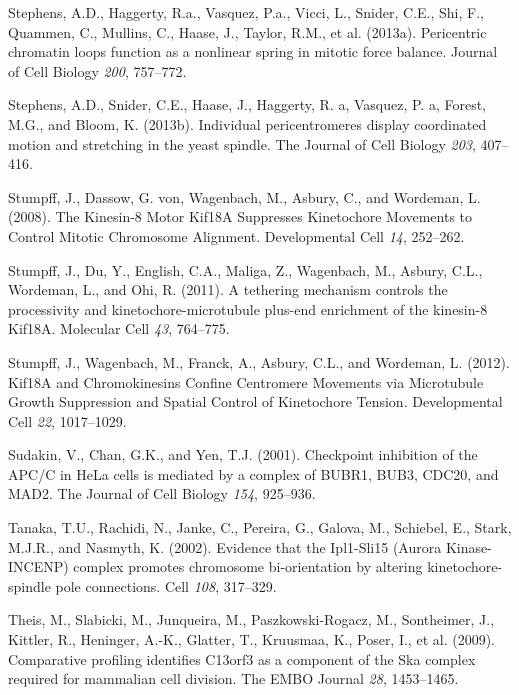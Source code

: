 \documentclass[12pt,a4paper,twoside,openright]{book}
\begin{document}
\hypertarget{ref-Stephens2013}{}
Stephens, A.D., Haggerty, R.a., Vasquez, P.a., Vicci, L., Snider, C.E.,
Shi, F., Quammen, C., Mullins, C., Haase, J., Taylor, R.M., et al.
(2013a). Pericentric chromatin loops function as a nonlinear spring in
mitotic force balance. Journal of Cell Biology \emph{200}, 757--772.

\hypertarget{ref-Stephens2013a}{}
Stephens, A.D., Snider, C.E., Haase, J., Haggerty, R. a, Vasquez, P. a,
Forest, M.G., and Bloom, K. (2013b). Individual pericentromeres display
coordinated motion and stretching in the yeast spindle. The Journal of
Cell Biology \emph{203}, 407--416.

\hypertarget{ref-Stumpff2008}{}
Stumpff, J., Dassow, G. von, Wagenbach, M., Asbury, C., and Wordeman, L.
(2008). The Kinesin-8 Motor Kif18A Suppresses Kinetochore Movements to
Control Mitotic Chromosome Alignment. Developmental Cell \emph{14},
252--262.

\hypertarget{ref-Stumpff2011a}{}
Stumpff, J., Du, Y., English, C.A., Maliga, Z., Wagenbach, M., Asbury,
C.L., Wordeman, L., and Ohi, R. (2011). A tethering mechanism controls
the processivity and kinetochore-microtubule plus-end enrichment of the
kinesin-8 Kif18A. Molecular Cell \emph{43}, 764--775.

\hypertarget{ref-Stumpff2012}{}
Stumpff, J., Wagenbach, M., Franck, A., Asbury, C.L., and Wordeman, L.
(2012). Kif18A and Chromokinesins Confine Centromere Movements via
Microtubule Growth Suppression and Spatial Control of Kinetochore
Tension. Developmental Cell \emph{22}, 1017--1029.

\hypertarget{ref-Sudakin2001}{}
Sudakin, V., Chan, G.K., and Yen, T.J. (2001). Checkpoint inhibition of
the APC/C in HeLa cells is mediated by a complex of BUBR1, BUB3, CDC20,
and MAD2. The Journal of Cell Biology \emph{154}, 925--936.

\hypertarget{ref-Tanaka2002}{}
Tanaka, T.U., Rachidi, N., Janke, C., Pereira, G., Galova, M., Schiebel,
E., Stark, M.J.R., and Nasmyth, K. (2002). Evidence that the Ipl1-Sli15
(Aurora Kinase-INCENP) complex promotes chromosome bi-orientation by
altering kinetochore-spindle pole connections. Cell \emph{108},
317--329.

\hypertarget{ref-Theis2009}{}
Theis, M., Slabicki, M., Junqueira, M., Paszkowski-Rogacz, M.,
Sontheimer, J., Kittler, R., Heninger, A.-K., Glatter, T., Kruusmaa, K.,
Poser, I., et al. (2009). Comparative profiling identifies C13orf3 as a
component of the Ska complex required for mammalian cell division. The
EMBO Journal \emph{28}, 1453--1465.
\end{document}
